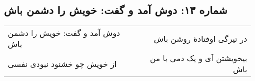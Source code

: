 \begin{center}
\section*{شماره ۱۳: دوش آمد و گفت: خویش را دشمن باش}
\label{sec:013}
\begin{longtable}{l p{0.5cm} r}
دوش آمد و گفت: خویش را دشمن باش
&&
در تیرگی اوفتادهٔ روشن باش
\\
از خویش چو خشنود نبودی نفسی
&&
بیخویشتن آی و یک دمی با من باش
\\
\end{longtable}
\end{center}
